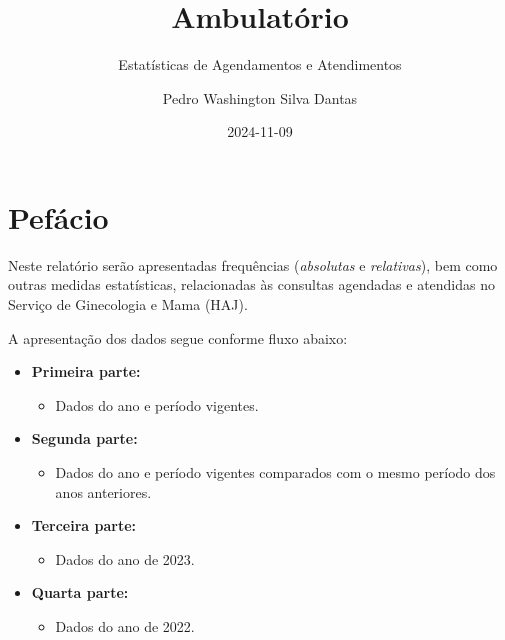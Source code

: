 \documentclass[
  letterpaper,
  DIV=11,
  numbers=noendperiod]{scrreprt}
\title{Ambulatório}
\subtitle{Estatísticas de Agendamentos e Atendimentos}
\author{Pedro Washington Silva Dantas}
\date{2024-11-09}
\providecommand{\tightlist}{%
  \setlength{\itemsep}{0pt}\setlength{\parskip}{0pt}}\usepackage{longtable,booktabs,array}
\renewcommand*\contentsname{Índice}
\newcommand\contentsname{Índice}
\begin{document}
\maketitle
\ifdefined\Shaded\renewenvironment{Shaded}{\begin{tcolorbox}[breakable, sharp corners, enhanced, borderline west={3pt}{0pt}{shadecolor}, interior hidden, boxrule=0pt, frame hidden]}{\end{tcolorbox}}\fi

\renewcommand*\contentsname{Índice}
{
\hypersetup{linkcolor=}
\setcounter{tocdepth}{2}
\tableofcontents
}

\hypertarget{pefuxe1cio}{%
\chapter*{Pefácio}\label{pefuxe1cio}}


Neste relatório serão apresentadas frequências (\emph{absolutas} e
\emph{relativas}), bem como outras medidas estatísticas, relacionadas às
consultas agendadas e atendidas no Serviço de Ginecologia e Mama (HAJ).

A apresentação dos dados segue conforme fluxo abaixo:

\begin{itemize}
\item
  \textbf{Primeira parte:}

  \begin{itemize}
  \tightlist
  \item
    Dados do ano e período vigentes.
  \end{itemize}
\item
  \textbf{Segunda parte:}

  \begin{itemize}
  \tightlist
  \item
    Dados do ano e período vigentes comparados com o mesmo período dos
    anos anteriores.
  \end{itemize}
\item
  \textbf{Terceira parte:}

  \begin{itemize}
  \tightlist
  \item
    Dados do ano de 2023.
  \end{itemize}
\item
  \textbf{Quarta parte:}

  \begin{itemize}
  \tightlist
  \item
    Dados do ano de 2022.
  \end{itemize}
\end{itemize}
\end{document}
